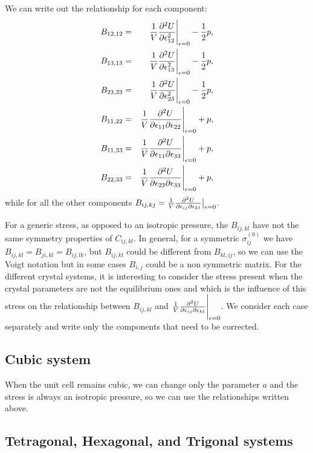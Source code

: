 \documentclass[12pt,a4paper,twoside]{report}
\begin{document}
We can write out the relationship for each component: 
\begin{eqnarray}
B_{12,12} &=& {1 \over V}{\partial^2 U \over \partial \epsilon^2_{12}}\Bigg|_{\epsilon=0} - {1\over 2} p, \\
B_{13,13} &=& {1 \over V}{\partial^2 U \over \partial \epsilon^2_{13} 
}\Bigg|_{\epsilon=0} - {1\over 2} p, \\
B_{23,23} &=& {1 \over V}{\partial^2 U \over \partial \epsilon^2_{23} 
}\Bigg|_{\epsilon=0} - {1\over 2} p, \\
B_{11,22} &=& {1 \over V}{\partial^2 U \over \partial \epsilon_{11} 
\partial \epsilon_{22}}\Bigg|_{\epsilon=0} + p, \\
B_{11,33} &=& {1 \over V}{\partial^2 U \over \partial \epsilon_{11} 
\partial \epsilon_{33}}\Bigg|_{\epsilon=0} + p, \\
B_{22,33} &=& {1 \over V}{\partial^2 U \over \partial \epsilon_{22} 
\partial \epsilon_{33}}\Bigg|_{\epsilon=0} + p, 
\end{eqnarray}
while for all the other components $B_{ij,kj}=
{1 \over V}{\partial^2 U \over \partial \epsilon_{ij} 
\partial \epsilon_{kl}}\big|_{\epsilon=0}$.

For a generic stress, as opposed to an isotropic pressure, the $B_{ij,kl}$ 
have not the same symmetry properties of $C_{ij,kl}$. In general, for a 
symmetric $\sigma^{(0)}_{ij}$ we have $B_{ij,kl}=B_{ji,kl}=B_{ij,lk}$,
but $B_{ij,kl}$ could be different from $B_{kl,ij}$, so we can use
the Voigt notation but in some cases $B_{i,j}$ could be a non symmetric
matrix.
For the different crystal systems, it is interesting to consider 
the stress present when the crystal parameters are not the equilibrium ones
and which is the influence of this stress on the relationship between 
$B_{ij,kl}$ and 
${1 \over V}{\partial^2 U \over \partial \epsilon_{ij} 
\partial \epsilon_{kl}}\Bigg|_{\epsilon=0}$. We consider each case
separately and write only the components that need to be corrected.

{\color{web-blue}\subsection{Cubic system}}
\color{black}

When the unit cell remains cubic, we can change only the parameter 
$a$ and the stress is always an isotropic pressure, so we can use the 
relationships written above.

{\color{web-blue}\subsection{Tetragonal, Hexagonal, and Trigonal systems}}
\color{black}
\end{document}
